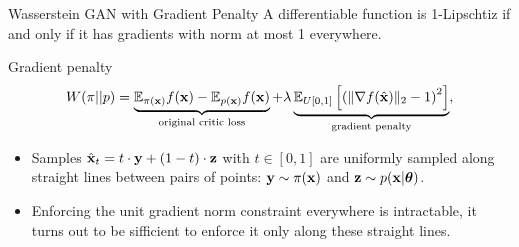 \documentclass{beamer}
\begin{document}
\begin{frame}{Wasserstein GAN with Gradient Penalty}
	A differentiable function is 1-Lipschtiz if and only if it has gradients with norm at most 1 everywhere.
	\begin{block}{Gradient penalty}
		\vspace{-0.3cm}
		\[
			W(\pi || p) = \underbrace{\mathbb{E}_{\pi(\mathbf{x})} f(\mathbf{x})  - \mathbb{E}_{p(\mathbf{x})} f(\mathbf{x})}_{\text{original critic loss}} + \lambda \underbrace{\mathbb{E}_{U[0, 1]} \left[ \left( \| \nabla f(\hat{\mathbf{x}}) \|_2 - 1 \right) ^ 2\right]}_{\text{gradient penalty}},
		\]
		\vspace{-0.3cm}
	\end{block}
	\begin{itemize}
		\item Samples $\hat{\mathbf{x}}_t = t \cdot \mathbf{y} + (1 - t) \cdot \mathbf{z}$ with $t \in [0, 1]$ are uniformly sampled along straight lines between pairs of points: $\mathbf{y} \sim \pi(\mathbf{x})$ and $\mathbf{z} \sim p(\mathbf{x} | \boldsymbol{\theta})$.
		\item Enforcing the unit gradient norm constraint everywhere is intractable, it turns out to be sifficient to enforce it only along these straight lines.
	\end{itemize}

\end{frame}
\end{document}
